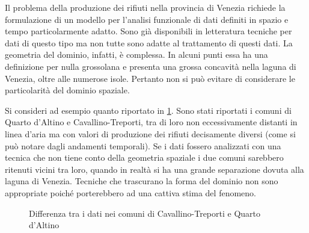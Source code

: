 \documentclass[a4paper,11pt,twoside,openright]{book}							%
\begin{document}
Il problema della produzione dei rifiuti nella provincia di Venezia richiede la formulazione di un modello per l'analisi funzionale di dati definiti in spazio e tempo particolarmente adatto. Sono già disponibili in letteratura tecniche per dati di questo tipo ma non tutte sono adatte al trattamento di questi dati. La geometria del dominio, infatti, è complessa. In alcuni punti essa ha una definizione per nulla grossolana e presenta una grossa concavità nella laguna di Venezia, oltre alle numerose isole. Pertanto non si può evitare di considerare le particolarità del dominio spaziale.

Si consideri ad esempio quanto riportato in \ref{fig:intro3}. Sono stati riportati i comuni di Quarto d'Altino e Cavallino-Treporti, tra di loro non eccessivamente distanti in linea d'aria ma con valori di produzione dei rifiuti decisamente diversi (come si può notare dagli andamenti temporali). Se i dati fossero analizzati con una tecnica che non tiene conto della geometria spaziale i due comuni sarebbero ritenuti vicini tra loro, quando in realtà si ha una grande separazione dovuta alla laguna di Venezia. Tecniche che trascurano la forma del dominio non sono appropriate poiché porterebbero ad una cattiva stima del fenomeno.
\newpage
\begin{figure}[t]
	\centering
	\caption{Differenza tra i dati nei comuni di Cavallino-Treporti e Quarto d'Altino}
	\label{fig:intro3}
\end{figure}
\end{document}
